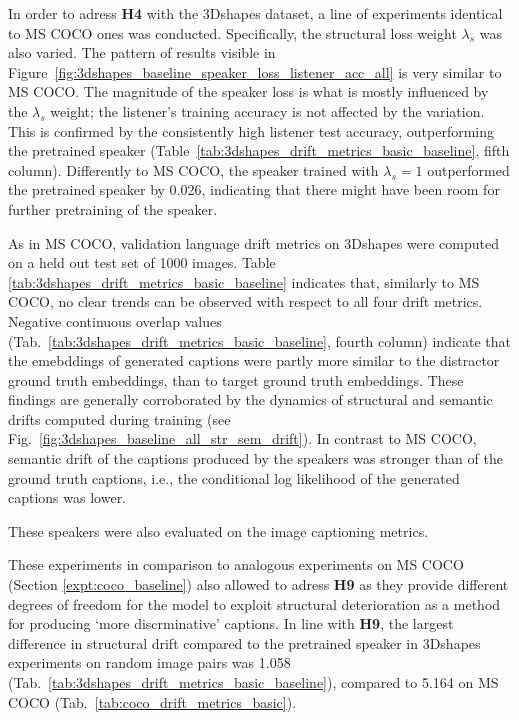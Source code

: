 In order to adress \textbf{H4} with the 3Dshapes dataset, a line of experiments identical to MS COCO ones was conducted. Specifically, the structural loss weight $\lambda_s$ was also varied. The pattern of results visible in Figure~\ref{fig:3dshapes_baseline_speaker_loss_listener_acc_all} is very similar to MS COCO. The magnitude of the speaker loss is what is mostly influenced by the $\lambda_s$ weight; the listener's training accuracy is not affected by the variation. This is confirmed by the consistently high listener test accuracy, outperforming the pretrained speaker (Table~\ref{tab:3dshapes_drift_metrics_basic_baseline}, fifth column). Differently to MS COCO, the speaker trained with $\lambda_s = 1$ outperformed the pretrained speaker by 0.026, indicating that there might have been room for further pretraining of the speaker. 

As in MS COCO, validation language drift metrics on 3Dshapes were computed on a held out test set of 1000 images. Table \ref{tab:3dshapes_drift_metrics_basic_baseline} indicates that, similarly to MS COCO, no clear trends can be observed with respect to all four drift metrics. Negative continuous overlap values (Tab.~\ref{tab:3dshapes_drift_metrics_basic_baseline}, fourth column) indicate that the emebddings of generated captions were partly more similar to the distractor ground truth embeddings, than to target ground truth embeddings. These findings are generally corroborated by the dynamics of structural and semantic drifts computed during training (see Fig.~\ref{fig:3dshapes_baseline_all_str_sem_drift}). In contrast to MS COCO, semantic drift of the captions produced by the speakers was stronger than of the ground truth captions, i.e., the conditional log likelihood of the generated captions was lower. 

These speakers were also evaluated on the image captioning metrics. 

These experiments in comparison to analogous experiments on MS COCO (Section \ref{expt:coco_baseline}) also allowed to adress \textbf{H9} as they provide different degrees of freedom for the model to exploit structural deterioration as a method for producing `more discrminative' captions. In line with \textbf{H9}, the largest difference in structural drift compared to the pretrained speaker in 3Dshapes experiments on random image pairs was 1.058 (Tab.~\ref{tab:3dshapes_drift_metrics_basic_baseline}), compared to 5.164 on MS COCO (Tab.~\ref{tab:coco_drift_metrics_basic}). 

